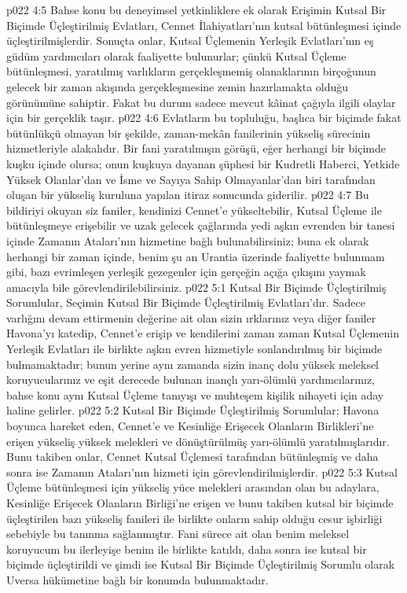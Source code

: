 \vs p022 4:5 Bahse konu bu deneyimsel yetkinliklere ek olarak Erişimin Kutsal Bir Biçimde Üçleştirilmiş Evlatları, Cennet İlahiyatları’nın kutsal bütünleşmesi içinde üçleştirilmişlerdir. Sonuçta onlar, Kutsal Üçlemenin Yerleşik Evlatları’nın eş güdüm yardımcıları olarak faaliyette bulunurlar; çünkü Kutsal Üçleme bütünleşmesi, yaratılmış varlıkların gerçekleşmemiş olanaklarının birçoğunun gelecek bir zaman akışında gerçekleşmesine zemin hazırlamakta olduğu görünümüne sahiptir. Fakat bu durum sadece mevcut kâinat çağıyla ilgili olaylar için bir gerçeklik taşır.
\vs p022 4:6 Evlatların bu topluluğu, başlıca bir biçimde fakat bütünlükçü olmayan bir şekilde, zaman\hyp{}mekân fanilerinin yükseliş sürecinin hizmetleriyle alakalıdır. Bir fani yaratılmışın görüşü, eğer herhangi bir biçimde kuşku içinde olursa; onun kuşkuya dayanan şüphesi bir Kudretli Haberci, Yetkide Yüksek Olanlar’dan ve İsme ve Sayıya Sahip Olmayanlar’dan biri tarafından oluşan bir yükseliş kuruluna yapılan itiraz sonucunda giderilir.
\vs p022 4:7 Bu bildiriyi okuyan siz faniler, kendinizi Cennet’e yükseltebilir, Kutsal Üçleme ile bütünleşmeye erişebilir ve uzak gelecek çağlarında yedi aşkın evrenden bir tanesi içinde Zamanın Ataları’nın hizmetine bağlı bulunabilirsiniz; buna ek olarak herhangi bir zaman içinde, benim şu an Urantia üzerinde faaliyette bulunmam gibi, bazı evrimleşen yerleşik gezegenler için gerçeğin açığa çıkışını yaymak amacıyla bile görevlendirilebilirsiniz.
\vs p022 5:1 Kutsal Bir Biçimde Üçleştirilmiş Sorumlular, Seçimin Kutsal Bir Biçimde Üçleştirilmiş Evlatları’dır. Sadece varlığını devam ettirmenin değerine ait olan sizin ırklarınız veya diğer faniler Havona’yı katedip, Cennet’e erişip ve kendilerini zaman zaman Kutsal Üçlemenin Yerleşik Evlatları ile birlikte aşkın evren hizmetiyle sonlandırılmış bir biçimde bulmamaktadır; bunun yerine aynı zamanda sizin inanç dolu yüksek meleksel koruyucularınız ve eşit derecede bulunan inançlı yarı\hyp{}ölümlü yardımcılarınız, bahse konu aynı Kutsal Üçleme tanıyışı ve muhteşem kişilik nihayeti için aday haline gelirler.
\vs p022 5:2 Kutsal Bir Biçimde Üçleştirilmiş Sorumlular; Havona boyunca hareket eden, Cennet’e ve Kesinliğe Erişecek Olanların Birlikleri’ne erişen yükseliş yüksek melekleri ve dönüştürülmüş yarı\hyp{}ölümlü yaratılmışlarıdır. Bunu takiben onlar, Cennet Kutsal Üçlemesi tarafından bütünleşmiş ve daha sonra ise Zamanın Ataları’nın hizmeti için görevlendirilmişlerdir.
\vs p022 5:3 Kutsal Üçleme bütünleşmesi için yükseliş yüce melekleri arasından olan bu adaylara, Kesinliğe Erişecek Olanların Birliği’ne erişen ve bunu takiben kutsal bir biçimde üçleştirilen bazı yükseliş fanileri ile birlikte onların sahip olduğu cesur işbirliği sebebiyle bu tanınma sağlanmıştır. Fani sürece ait olan benim meleksel koruyucum bu ilerleyişe benim ile birlikte katıldı, daha sonra ise kutsal bir biçimde üçleştirildi ve şimdi ise Kutsal Bir Biçimde Üçleştirilmiş Sorumlu olarak Uversa hükümetine bağlı bir konumda bulunmaktadır.

